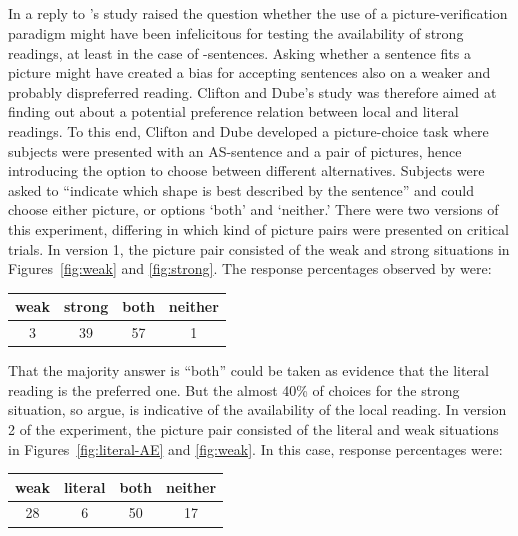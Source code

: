 \documentclass[fleqn,reqno,10pt,draft]{article}
\newcommand{\as}{\acro{as}}
\begin{document}
\subsection{\citet{CliftonDube2010:Embedded-Implic}}
\label{sec:clifton-dube}

In a reply to \citeauthor{GeurtsPouscoulous2009:Embedded-Implic}'s
study \citeauthor{CliftonDube2010:Embedded-Implic} raised the question
whether the use of a picture-verification paradigm might have been
infelicitous for testing the availability of strong readings, at least
in the case of \as-sentences. Asking whether a sentence fits a picture
might have created a bias for accepting sentences also on a weaker and
probably dispreferred reading. Clifton and Dube's study was therefore
aimed at finding out about a potential preference relation between
local and literal readings. To this end, Clifton and Dube developed a
picture-choice task where subjects were presented with an AS-sentence
and a pair of pictures, hence introducing the option to choose between
different alternatives. Subjects were asked to ``indicate which shape
is best described by the sentence'' and could choose either picture,
or options `both' and `neither.' There were two versions of this
experiment, differing in which kind of picture pairs were presented on
critical trials. In version 1, the picture pair consisted of the weak
and strong situations in Figures~\ref{fig:weak} and
\ref{fig:strong}. The response percentages observed by
\citeauthor{CliftonDube2010:Embedded-Implic} were:

\begin{center}
  \begin{tabular}{cccc}
    weak & strong & both & neither
    \\ \midrule 
 3 & 39 & 57 & 1 
  \end{tabular}
\end{center}

\noindent That the majority answer is ``both'' could be taken as
evidence that the literal reading is the preferred one. But the almost
40\% of choices for the strong situation, so
\citeauthor{CliftonDube2010:Embedded-Implic} argue, is indicative of
the availability of the local reading. In version 2 of the experiment,
the picture pair consisted of the literal and weak situations in
Figures~\ref{fig:literal-AE} and \ref{fig:weak}. In this case,
response percentages were:

\begin{center}
  \begin{tabular}{cccc}
    weak & literal & both & neither
    \\ \midrule 
    28 & 6 & 50 & 17 
  \end{tabular}
\end{center}
\end{document}
